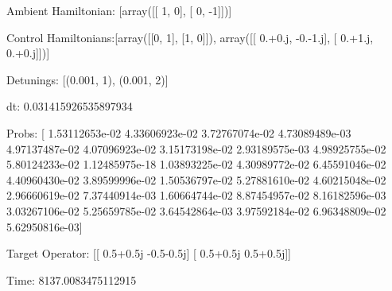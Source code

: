 \documentclass{article}
\begin{document}
    

\newpage

Ambient Hamiltonian: [array([[ 1,  0],
       [ 0, -1]])]

Control Hamiltonians:[array([[0, 1],
       [1, 0]]), array([[ 0.+0.j, -0.-1.j],
       [ 0.+1.j,  0.+0.j]])]

Detunings: [(0.001, 1), (0.001, 2)]

 dt: 0.031415926535897934

Probs: [  1.53112653e-02   4.33606923e-02   3.72767074e-02   4.73089489e-03
   4.97137487e-02   4.07096923e-02   3.15173198e-02   2.93189575e-03
   4.98925755e-02   5.80124233e-02   1.12485975e-18   1.03893225e-02
   4.30989772e-02   6.45591046e-02   4.40960430e-02   3.89599996e-02
   1.50536797e-02   5.27881610e-02   4.60215048e-02   2.96660619e-02
   7.37440914e-03   1.60664744e-02   8.87454957e-02   8.16182596e-03
   3.03267106e-02   5.25659785e-02   3.64542864e-03   3.97592184e-02
   6.96348809e-02   5.62950816e-03]

Target Operator: [[ 0.5+0.5j -0.5-0.5j]
 [ 0.5+0.5j  0.5+0.5j]]

Time: 8137.0083475112915
\end{document}
